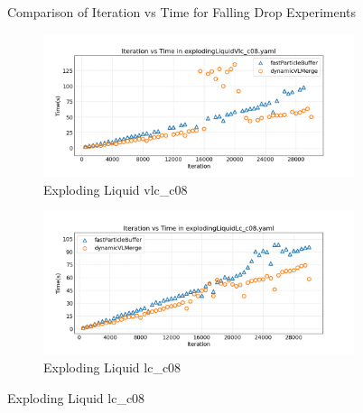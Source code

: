 \begin{figure}[htbp]
    \vspace{1em}
    \caption{Comparison of Iteration vs Time for Falling Drop Experiments}
    \label{fig:mainfallingDropIter}
\end{figure}



\begin{figure}[htbp]
    \centering
    \vspace{-0.5em}
    \begin{subfigure}[b]{\textwidth}
        \centering
        \includegraphics[width=0.9\linewidth]{graphs/explodingLiquid/normalExperiments/iter/vlcc08.png}
        \vspace{-0.5em}
        \caption{\scriptsize Exploding Liquid vlc\_c08}
        \label{fig:vlcc08explodingLiquidIter}
    \end{subfigure}

    \begin{subfigure}[b]{\textwidth}
        \centering
        \includegraphics[width=0.9\linewidth]{graphs/explodingLiquid/normalExperiments/iter/lcc08.png}
        \vspace{-0.5em}
        \caption{\scriptsize Exploding Liquid lc\_c08}
        \label{fig:lcc08explodingLiquidIter}
    \end{subfigure}


\end{figure}
